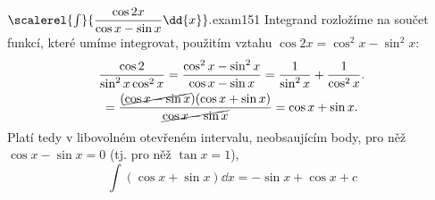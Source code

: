\begin{mathexam}{\(\protect\scalerel{\int}{\dfrac{\cos2x}{\cos x - \sin x}\dd{x}}.\)}{exam151} 
  Integrand rozložíme na součet funkcí, které umíme integrovat, použitím vztahu \(\cos2x=\cos^2x -
  \sin^2x\): 
  \begin{multline*}
    \dfrac{\cos2}{\sin^2x\cos^2x} 
      = \dfrac{\cos^2x - \sin^2x}{\cos x - \sin x} = \dfrac{1}{\sin^2x} + \dfrac{1}{\cos^2x}. \\
      = \dfrac{(\cancel{\cos x - \sin x})(\cos x + \sin x)}{\cancel{\cos x - \sin x}} 
      = \cos x + \sin x.  
  \end{multline*}
  Platí tedy v libovolném otevřeném intervalu, neobsaujícím body, pro něž \(\cos x - \sin x = 0\)
  (tj. pro něž \(\tan x = 1\)),
  \begin{equation*}
    \int(\cos x + \sin x)\dd{x} = -\sin x + \cos x + c 
  \end{equation*}
  \vspace{-4mm}
\end{mathexam}